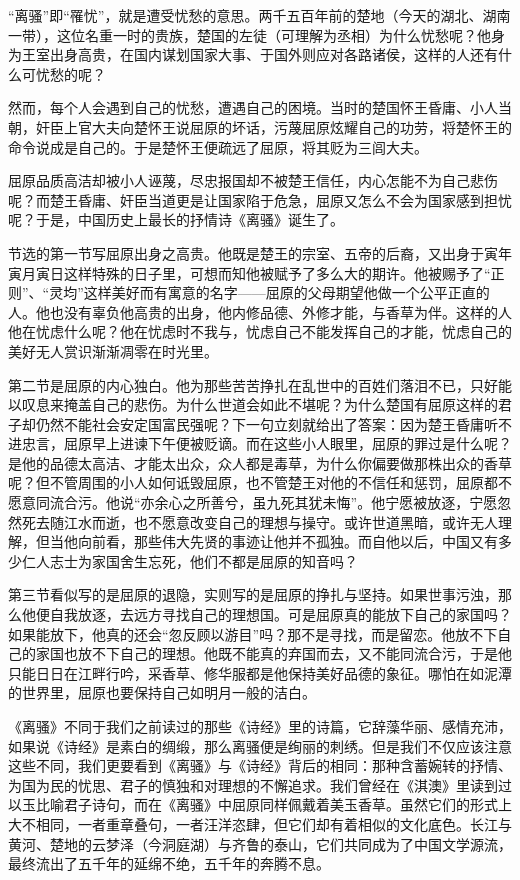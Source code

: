 \begin{appreciation}
“离骚”即“罹忧”，就是遭受忧愁的意思。两千五百年前的楚地（今天的湖北、湖南一带），这位名重一时的贵族，楚国的左徒（可理解为丞相）为什么忧愁呢？他身为王室出身高贵，在国内谋划国家大事、于国外则应对各路诸侯，这样的人还有什么可忧愁的呢？

然而，每个人会遇到自己的忧愁，遭遇自己的困境。当时的楚国怀王昏庸、小人当朝，奸臣上官大夫向楚怀王说屈原的坏话，污蔑屈原炫耀自己的功劳，将楚怀王的命令说成是自己的。于是楚怀王便疏远了屈原，将其贬为三闾大夫。

屈原品质高洁却被小人诬蔑，尽忠报国却不被楚王信任，内心怎能不为自己悲伤呢？而楚王昏庸、奸臣当道更是让国家陷于危急，屈原又怎么不会为国家感到担忧呢？于是，中国历史上最长的抒情诗《离骚》诞生了。

节选的第一节写屈原出身之高贵。他既是楚王的宗室、五帝的后裔，又出身于寅年寅月寅日这样特殊的日子里，可想而知他被赋予了多么大的期许。他被赐予了“正则”、“灵均”这样美好而有寓意的名字——屈原的父母期望他做一个公平正直的人。他也没有辜负他高贵的出身，他内修品德、外修才能，与香草为伴。这样的人他在忧虑什么呢？他在忧虑时不我与，忧虑自己不能发挥自己的才能，忧虑自己的美好无人赏识渐渐凋零在时光里。

第二节是屈原的内心独白。他为那些苦苦挣扎在乱世中的百姓们落泪不已，只好能以叹息来掩盖自己的悲伤。为什么世道会如此不堪呢？为什么楚国有屈原这样的君子却仍然不能社会安定国富民强呢？下一句立刻就给出了答案：因为楚王昏庸听不进忠言，屈原早上进谏下午便被贬谪。而在这些小人眼里，屈原的罪过是什么呢？是他的品德太高洁、才能太出众，众人都是毒草，为什么你偏要做那株出众的香草呢？但不管周围的小人如何诋毁屈原，也不管楚王对他的不信任和惩罚，屈原都不愿意同流合污。他说“亦余心之所善兮，虽九死其犹未悔”。他宁愿被放逐，宁愿忽然死去随江水而逝，也不愿意改变自己的理想与操守。或许世道黑暗，或许无人理解，但当他向前看，那些伟大先贤的事迹让他并不孤独。而自他以后，中国又有多少仁人志士为家国舍生忘死，他们不都是屈原的知音吗？

第三节看似写的是屈原的退隐，实则写的是屈原的挣扎与坚持。如果世事污浊，那么他便自我放逐，去远方寻找自己的理想国。可是屈原真的能放下自己的家国吗？如果能放下，他真的还会“忽反顾以游目”吗？那不是寻找，而是留恋。他放不下自己的家国也放不下自己的理想。他既不能真的弃国而去，又不能同流合污，于是他只能日日在江畔行吟，采香草、修华服都是他保持美好品德的象征。哪怕在如泥潭的世界里，屈原也要保持自己如明月一般的洁白。

《离骚》不同于我们之前读过的那些《诗经》里的诗篇，它辞藻华丽、感情充沛，如果说《诗经》是素白的绸缎，那么离骚便是绚丽的刺绣。但是我们不仅应该注意这些不同，我们更要看到《离骚》与《诗经》背后的相同：那种含蓄婉转的抒情、为国为民的忧思、君子的慎独和对理想的不懈追求。我们曾经在《淇澳》里读到过以玉比喻君子诗句，而在《离骚》中屈原同样佩戴着美玉香草。虽然它们的形式上大不相同，一者重章叠句，一者汪洋恣肆，但它们却有着相似的文化底色。长江与黄河、楚地的云梦泽（今洞庭湖）与齐鲁的泰山，它们共同成为了中国文学源流，最终流出了五千年的延绵不绝，五千年的奔腾不息。
\end{appreciation}
